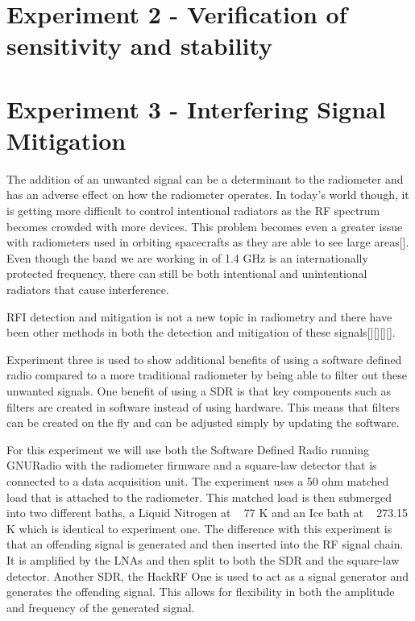 \section{Experiment 2 - Verification of sensitivity and stability}\label{Exp2}


\section{Experiment 3 - Interfering Signal Mitigation}\label{Exp3}
The addition of an unwanted signal can be a determinant to the radiometer and has an adverse effect on how the radiometer operates.  In today's world though, it is getting more difficult to control intentional radiators as the RF spectrum becomes crowded with more devices.  This problem becomes even a greater issue with radiometers used in orbiting spacecrafts as they are able to see large areas[\cite{DeRooRFI}].  Even though the band we are working in of 1.4 GHz is an internationally protected frequency, there can still be both intentional and unintentional radiators that cause interference.

RFI detection and mitigation is not a new topic in radiometry and there have been other methods in both the detection and mitigation of these signals[\cite{Forte}][\cite{McIntyre_RFI}][\cite{DeRoo}][\cite{Ellingson}].

Experiment three is used to show additional benefits of using a software defined radio compared to a more traditional radiometer by being able to filter out these unwanted signals.  One benefit of using a SDR is that key components such as filters are created in software instead of using hardware.  This means that filters can be created on the fly and can be adjusted simply by updating the software.  

For this experiment we will use both the Software Defined Radio running GNURadio with the radiometer firmware and a square-law detector that is connected to a data acquisition unit.  The experiment uses a 50 ohm matched load that is attached to the radiometer.  This matched load is then submerged into two different baths, a Liquid Nitrogen at ~ 77 K and an Ice bath at ~ 273.15 K which is identical to experiment one.  The difference with this experiment is that an offending signal is generated and then inserted into the RF signal chain.  It is amplified by the LNAs and then split to both the SDR and the square-law detector.  Another SDR, the HackRF One is used to act as a signal generator and generates the offending signal.  This allows for flexibility in both the amplitude and frequency of the generated signal.

